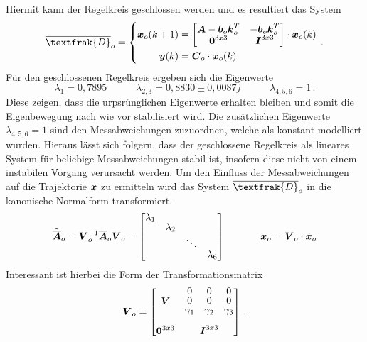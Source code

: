 Hiermit kann der Regelkreis geschlossen werden und es resultiert das System
\begin{equation}
\overline{\textfrak{D}}_o = \left\{ \begin{split}
\bs{x}_o(k+1) &= \begin{bmatrix}
\bs{A}-\bs{b}_o\bs{k}^T_o & -\bs{b}_o\bs{k}^T_o \\
\bs{0}^{3x3} & \bs{I}^{3x3}
\end{bmatrix}\cdot \bs{x}_o(k)
\\
\bs{y}(k) &= \bs{C}_o\cdot \bs{x}_o(k)
\end{split}\right.
\,.
\end{equation}
Für den geschlossenen Regelkreis ergeben sich die Eigenwerte
\begin{equation}
\lambda_1 = 0{,}7895 \hspace{35pt} \lambda_{2,3} = 0{,}8830 \pm 0{,}0087j \hspace{35pt} \lambda_{4,5,6} = 1
\,.
\end{equation}
Diese zeigen, dass die urpsrünglichen Eigenwerte erhalten bleiben und somit die Eigenbewegung nach wie vor stabilisiert wird. Die zusätzlichen Eigenwerte $\lambda_{4,5,6}=1$ sind den Messabweichungen zuzuordnen, welche als konstant modelliert wurden. Hieraus lässt sich folgern, dass der geschlossene Regelkreis als lineares System für beliebige Messabweichungen stabil ist, insofern diese nicht von einem instabilen Vorgang verursacht werden. Um den Einfluss der Messabweichungen auf die Trajektorie $\boldsymbol{x}$ zu ermitteln wird das System $\overline{\textfrak{D}}_o$ in die kanonische Normalform transformiert.
\begin{equation}
\tilde{\overline{\bs{A}}}_o = \bs{V}^{-1}_o\overline{\bs{A}}_o\bs{V}_o = \begin{bmatrix}
\lambda_1 & & & \\
 & \lambda_2 & & \\
 & & \ddots & \\
 & & & \lambda_6
\end{bmatrix}
\hspace{35pt} 
\bs{x}_o = \bs{V}_o\cdot \tilde{\bs{x}}_o
\end{equation}
Interessant ist hierbei die Form der Transformationsmatrix
\begin{equation}
\renewcommand*{\arraystretch}{0.8}
\bs{V}_o = \begin{bmatrix}
\bs{V} & \begin{matrix} 0 & 0 & 0 \\ 0 & 0 & 0 \\ \gamma_1 & \gamma_2 & \gamma_3 \end{matrix} 
\\ \\
\bs{0}^{3x3} & \bs{I}^{3x3}
\end{bmatrix}
\,.
\end{equation}
